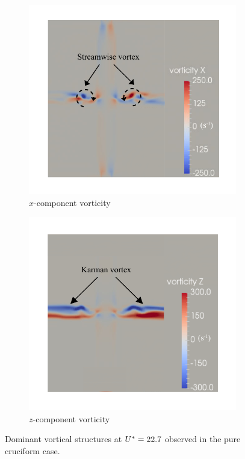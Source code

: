 \documentclass[oneside]{utmthesis}
\begin{document}
\begin{figure}
  \centering
  \begin{subfigure}[h]{0.7\textwidth}
    \includegraphics[width=\textwidth]{figs/vorx90}
    \caption{$x$-component vorticity}
    \label{fig:vorx90}
  \end{subfigure}

  \begin{subfigure}[h]{0.7\textwidth}
    \includegraphics[width=\textwidth]{figs/vorz90}
    \caption{$z$-component vorticity}
    \label{fig:vorz90}
  \end{subfigure}

  \caption{Dominant vortical structures at $U^{*} = 22.7$ observed in the pure cruciform case.} \label{fig:vortStruct90}
\end{figure}
\end{document}
